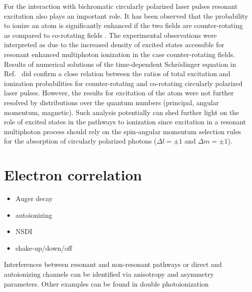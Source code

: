 For the interaction with bichromatic circularly polarized laser pulses resonant excitation also plays an important role. It has been observed that the probability to ionize an atom is significantly enhanced if the two fields are counter-rotating as compared to co-rotating fields \cite{mancuso2016}. The experimental observations were interpreted as due to the increased density of excited states accessible for resonant enhanced multiphoton ionization in the case counter-rotating fields. Results of numerical solutions of the time-dependent Schr\"odinger equation in Ref.\ \cite{mancuso2016} did confirm a close relation between the ratios of total excitation and ionization probabilities for counter-rotating and co-rotating circularly polarized laser pulses. However, the results for excitation of the atom were not further resolved by distributions over the quantum numbers (principal, angular momentum, magnetic). Such analysis potentially can shed further light on the role of excited states in the pathways to ionization since excitation in a resonant multiphoton process should rely on the spin-angular momentum selection rules for the absorption of circularly polarized photons ($\Delta l = \pm 1$ and $\Delta m = \pm 1$).

\section{Electron correlation} %
\label{sec:electron_correlation}
\begin{itemize}
    \item Auger decay
    \item autoionizing
    \item NSDI
    \item shake-up/down/off
\end{itemize}

Interferences between resonant and non-resonant pathways \cite{ishikawa2012} or direct and autoionizing channels \cite{cirelli2018} can be identified via anisotropy and asymmetry parameters. Other examples can be found in double photoionization \cite{maulbetsch1992}


